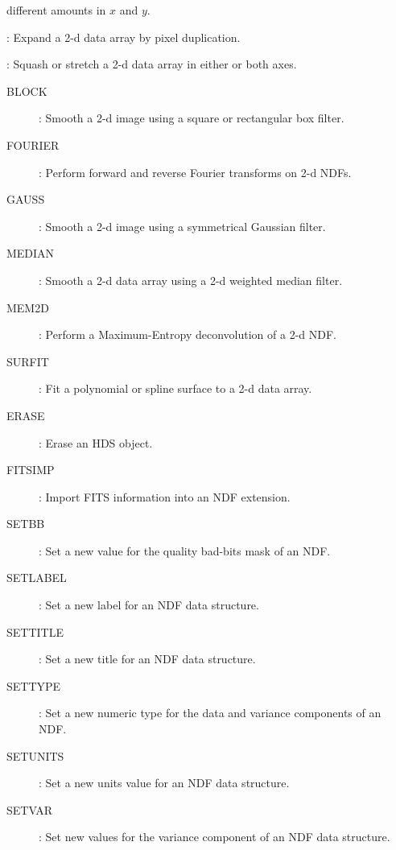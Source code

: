 \begin{description}
\begin {description}
\begin {description}
 different amounts in $x$ and $y$.
\item [PIXDUPE]:
 Expand a 2-d data array by pixel duplication.
\item [SQORST]:
 Squash or stretch a 2-d data array in either or both axes.
\end {description}
\item [Filtering:]\hfill
\begin{description}
\item [BLOCK]:
 Smooth a 2-d image using a square or rectangular box filter.
\item [FOURIER]:
 Perform forward and reverse Fourier transforms on 2-d NDFs.
\item [GAUSS]:
 Smooth a 2-d image using a symmetrical Gaussian filter.
\item [MEDIAN]:
 Smooth a 2-d data array using a 2-d weighted median filter.
\item [MEM2D]:
 Perform a Maximum-Entropy deconvolution of a 2-d NDF.
\item [SURFIT]:
 Fit a polynomial or spline surface to a 2-d data array.
\end {description}
\item [NDF and HDS components:]\hfill
\begin{description}
\item [ERASE]:
 Erase an HDS object.
\item [FITSIMP]:
 Import FITS information into an NDF extension.
\item [SETBB]:
 Set a new value for the quality bad-bits mask of an NDF.
\item [SETLABEL]:
 Set a new label for an NDF data structure.
\item [SETTITLE]:
 Set a new title for an NDF data structure.
\item [SETTYPE]:
 Set a new numeric type for the data and variance components of an NDF.
\item [SETUNITS]:
 Set a new units value for an NDF data structure.
\item [SETVAR]:
 Set new values for the variance component of an NDF data structure.
\end{description}
\end {description}


\end{description}

